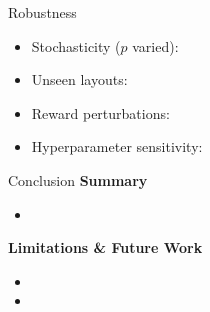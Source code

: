 \documentclass[aspectratio=169]{beamer}
\begin{document}
\begin{frame}{Robustness}
  \begin{itemize}
    \item Stochasticity ($p$ varied):
    \item Unseen layouts:
    \item Reward perturbations:
    \item Hyperparameter sensitivity:
  \end{itemize}
\end{frame}

\begin{frame}{Conclusion}
  \textbf{Summary}
  \begin{itemize}
    \item
  \end{itemize}
  \textbf{Limitations \& Future Work}
  \begin{itemize}
    \item
    \item
  \end{itemize}
\end{frame}
\end{document}
